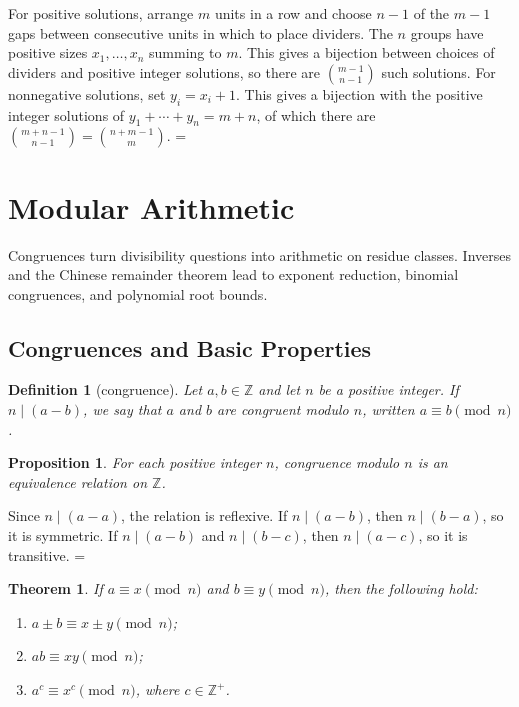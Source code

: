 \documentclass[11pt]{article}
\makeatletter
\let\nt@closedisplay\]
\def\nt@guardedclose{\@ifnextchar\par{\nt@closeafterpar}{\@ifnextchar\end{\postdisplaypenalty\@M\nt@closedisplay}{\nt@closedisplay}}}
\def\nt@closeafterpar\par{\@ifnextchar\par{\nt@closeafterpar}{\@ifnextchar\end{\postdisplaypenalty\@M\nt@closedisplay\par}{\nt@closedisplay\par}}}
\renewenvironment{proof}[1][\proofname]{\par
  \pushQED{\qed}\normalfont\topsep\medskipamount\edef\nt@afterproof{\@endparpenalty=\the\@endparpenalty\relax}\@beginparpenalty\@M\@endparpenalty\@M\let\]\nt@guardedclose\trivlist\item[]\textit{#1\@addpunct{.}} \ignorespaces}{\ifvmode\addpenalty\@M\fi\popQED\nt@afterproof\endtrivlist\@endpefalse}
\theoremstyle{ntstyle}
\newtheorem{theorem}{Theorem}[subsection]
\newtheorem{definition}{Definition}[subsection]
\newtheorem{proposition}{Proposition}[subsection]
\makeatother
\begin{document}
\begin{proof} For positive solutions, arrange $m$ units in a row
  and choose $n-1$ of the $m-1$ gaps between consecutive units in which
  to place dividers. The $n$ groups have positive sizes $x_1,\ldots,x_n$ summing
  to $m$. This gives a bijection between choices of dividers and positive
  integer solutions, so there are $\binom{m-1}{n-1}$ such solutions.
  For nonnegative solutions, set $y_i=x_i+1$. This gives a bijection
  with the positive integer solutions of $y_1+\cdots+y_n=m+n$, of which
  there are $\binom{m+n-1}{n-1}=\binom{n+m-1}{m}$.
\end{proof}
\newpage


\section{Modular Arithmetic}

Congruences turn divisibility questions into arithmetic on residue classes. Inverses and the Chinese remainder
theorem lead to exponent reduction, binomial congruences, and polynomial root bounds.


\subsection{Congruences and Basic Properties}

\begin{definition}[congruence]\label{def:3.1.1}\label{def:congruence}
  Let $a, b \in \mathbb{Z}$ and let $n$ be a
  positive integer. If $n \mid (a - b)$, we say that $a$ and $b$ are congruent modulo $n$, written $a \equiv b \pmod{n}$.

\end{definition}

\begin{proposition}\label{prop:congruence-equivalence}
  For each positive integer $n$, congruence modulo $n$ is an equivalence
  relation on $\mathbb{Z}$.
\end{proposition}

\begin{proof}
  Since $n\mid(a-a)$, the relation is reflexive.
  If $n\mid(a-b)$, then $n\mid(b-a)$, so it is symmetric.
  If $n\mid(a-b)$ and $n\mid(b-c)$, then $n\mid(a-c)$, so it is transitive.
\end{proof}

\begin{theorem}\label{thm:3.1.1} If $a \equiv x \pmod{n}$ and $b \equiv y \pmod{n}$, then the following hold:

  \begin{enumerate}[label={\alph*)}]
    \item $a \pm b \equiv x \pm y \pmod{n}$;
    \item $ab \equiv xy \pmod{n}$;
    \item $a^{c} \equiv x^{c} \pmod{n}$, where $c \in \mathbb{Z}^+$.
  \end{enumerate}

\end{theorem}
\end{document}
